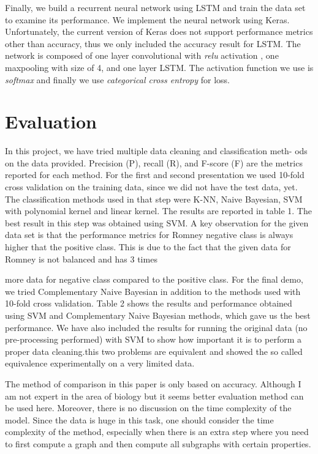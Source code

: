 \documentclass[letterpaper, 12pt]{article}
\begin{document}
Finally, we build a recurrent neural network using LSTM and train the data set to examine its 
performance. We implement the neural network using Keras. Unfortunately, the current version 
of Keras does not support performance metrics other than accuracy, thus we only included the 
accuracy result for LSTM. The network is composed of one layer convolutional with \emph{relu} activation
, one maxpooling with size of 4, and one layer LSTM. The activation function we use 
is \emph{softmax} and finally we use \emph{categorical cross entropy}
for loss. 


\section{Evaluation}
In this project, we have tried multiple data cleaning and classification meth- ods on the data provided. Precision (P), recall (R), and F-score (F) are the metrics reported for each method. For the first and second presentation we used 10-fold cross validation on the training data, since we did not have the test data, yet. The classification methods used in that step were K-NN, Naive Bayesian, SVM with polynomial kernel and linear kernel. The results are reported in table 1. The best result in this step was obtained using SVM. A key observation for the given data set is that the performance metrics for Romney negative class is always higher that the positive class. This is due to the fact that the given data for Romney is not balanced and has 3 times

       
more data for negative class compared to the positive class.
For the final demo, we tried Complementary Naive Bayesian in addition to the methods used with 10-fold cross validation. Table 2 shows the results and performance obtained using SVM and Complementary Naive Bayesian methods, which gave us the best performance. We have also included the results for running the original data (no pre-processing performed) with SVM
to show how important it is to perform a proper data cleaning.this two problems are equivalent and showed the so called equivalence experimentally on a very limited data.  


 \vspace*{10pt}



The method of comparison in this paper is only based on accuracy. Although I am not expert in the area of biology but it seems better evaluation method can be used here. Moreover,  there is no discussion on the time complexity of the model. Since the data is huge in this task, one should consider the time complexity of the method, especially when there is an extra step where you need to first compute a graph and then compute all subgraphs with certain properties. 
\end{document}
